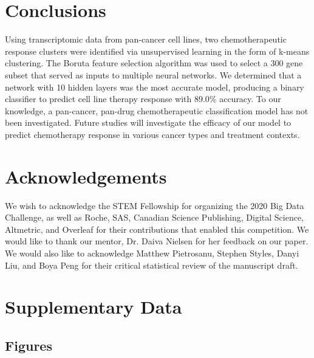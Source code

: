 \documentclass[10pt, letterpaper, twocolumn]{article}
\begin{document}
\section{Conclusions}
Using transcriptomic data from pan-cancer cell lines, two chemotherapeutic response clusters were identified via unsupervised learning in the form of k-means clustering. The Boruta feature selection algorithm was used to select a 300 gene subset that served as inputs to multiple neural networks. We determined that a network with 10 hidden layers was the most accurate model, producing a binary classifier to predict cell line therapy response with 89.0\% accuracy. To our knowledge, a pan-cancer, pan-drug chemotherapeutic classification model has not been investigated. Future studies will investigate the efficacy of our model to predict chemotherapy response in various cancer types and treatment contexts.


\section*{Acknowledgements}
We wish to acknowledge the STEM Fellowship for organizing the 2020 Big Data Challenge, as well as Roche, SAS, Canadian Science Publishing, Digital Science, Altmetric, and Overleaf for their contributions that enabled this competition. We would like to thank our mentor, Dr. Daiva Nielsen for her feedback on our paper. We would also like to acknowledge Matthew Pietrosanu, Stephen Styles, Danyi Liu, and Boya Peng for their critical statistical review of the manuscript draft.




\clearpage

\onecolumn
\renewcommand{\thepage}{S\arabic{page}}
\renewcommand{\thesection}{S}
\renewcommand{\thetable}{S\arabic{table}}
\renewcommand{\thefigure}{S\arabic{figure}}
\setcounter{figure}{0}

\section{Supplementary Data}
\subsection{Figures}
\end{document}
